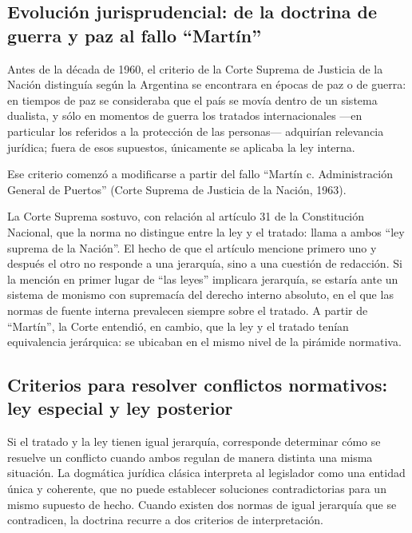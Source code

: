 \documentclass[12pt,oneside]{book}
\begin{document}
\subsection{Evolución jurisprudencial: de la doctrina de guerra y paz al fallo ``Martín''}

Antes de la década de 1960, el criterio de la Corte Suprema de Justicia de la Nación distinguía según la Argentina se encontrara en épocas de paz o de guerra: en tiempos de paz se consideraba que el país se movía dentro de un sistema dualista, y sólo en momentos de guerra los tratados internacionales —en particular los referidos a la protección de las personas— adquirían relevancia jurídica; fuera de esos supuestos, únicamente se aplicaba la ley interna.

Ese criterio comenzó a modificarse a partir del fallo ``Martín c. Administración General de Puertos'' (Corte Suprema de Justicia de la Nación, 1963).

\begin{important}
La Corte Suprema sostuvo, con relación al artículo 31 de la Constitución Nacional, que la norma no distingue entre la ley y el tratado: llama a ambos ``ley suprema de la Nación''. El hecho de que el artículo mencione primero uno y después el otro no responde a una jerarquía, sino a una cuestión de redacción. Si la mención en primer lugar de ``las leyes'' implicara jerarquía, se estaría ante un sistema de monismo con supremacía del derecho interno absoluto, en el que las normas de fuente interna prevalecen siempre sobre el tratado. A partir de ``Martín'', la Corte entendió, en cambio, que la ley y el tratado tenían equivalencia jerárquica: se ubicaban en el mismo nivel de la pirámide normativa.
\end{important}

\subsection{Criterios para resolver conflictos normativos: ley especial y ley posterior}

Si el tratado y la ley tienen igual jerarquía, corresponde determinar cómo se resuelve un conflicto cuando ambos regulan de manera distinta una misma situación. La dogmática jurídica clásica interpreta al legislador como una entidad única y coherente, que no puede establecer soluciones contradictorias para un mismo supuesto de hecho. Cuando existen dos normas de igual jerarquía que se contradicen, la doctrina recurre a dos criterios de interpretación.
\end{document}
